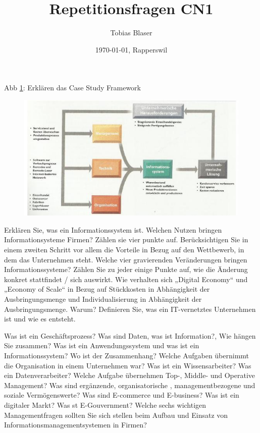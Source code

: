 \documentclass[ngerman,a4paper,12pt]{scrreprt}
\title{Repetitionsfragen CN1}
\author{Tobias Blaser}
\date{\today{}, Rapperswil}
\begin{document}
\tableofcontents
\clearpage

\ol
	\li Abb \ref{caseStudyFramework}: Erklären das  Case Study Framework
 	\begin{figure}[htp]
		\centering
		\includegraphics[scale=0.60]{img/R1.1.jpg}
		\caption{}
		\label{caseStudyFramework}
	\end{figure}
	\li Erklären Sie, was ein Informationssystem ist.
	\li Welchen Nutzen bringen Informationsysteme Firmen? Zählen sie vier punkte auf. 		\li Berücksichtigen Sie in einem zweiten Schritt vor allem die Vorteile in Bezug auf den Wettbewerb, in dem das Unternehmen steht.
	\li Welche vier gravierenden Veränderungen bringen Informationssysteme? Zählen Sie zu jeder einige Punkte auf, wie die Änderung konkret stattfindet / sich auswirkt.
	\li Wie verhalten sich „Digital Economy“ und „Economy of Scale“ in Bezug auf Stückkosten in Abhängigkeit der Ausbringungsmenge und Individualisierung in Abhängigkeit der Ausbringungsmenge. Warum?
	\li Definieren Sie, was ein IT-vernetztes Unternehmen ist und wie es entsteht.
\olS


\olR
	\li Was ist ein Geschäftsprozess?
	\li Was sind Daten, was ist Information?, Wie hängen Sie zusammen?
	\li Was ist ein Anwendungssystem und was ist ein Informationssystem? Wo ist der Zusammenhang?
	\li Welche Aufgaben übernimmt die Organisation in einem Unternehmen war?
	\li Was ist ein Wissensarbeiter? Was ein Datenverarbeiter?
	\li Welche Aufgabe übernehmen Top-, Middle- und Operative Management?
	\li Was sind ergänzende, organisatorische , managementbezogene und soziale Vermögenswerte?
	\li Was sind E-commerce und E-business? Was ist ein digitaler Markt? Was st E-Gouvernment?
	\li Welche sechs wichtigen Managementfragen sollten Sie sich stellen beim Aufbau und Einsatz von Informationsmanagementsystemen in Firmen?
\olS
\end{document}
